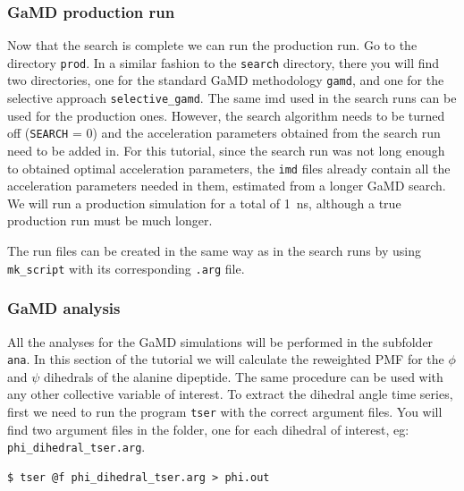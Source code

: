 \subsubsection{GaMD production run}
Now that the search is complete we can run the production run.
Go to the directory \texttt{prod}. In a similar fashion to the \texttt{search} directory, there you will find two directories, one for the standard GaMD methodology \texttt{gamd}, and one for the selective approach \texttt{selective\_gamd}. 
The same imd used in the search runs can be used for the production ones. However, the search algorithm needs to be turned off (\texttt{SEARCH} = 0) and the acceleration parameters obtained from the search run need to be added in. 
For this tutorial, since the search run was not long enough to obtained optimal acceleration parameters, the \texttt{imd} files already contain all the acceleration parameters needed in them, estimated from a longer GaMD search. We will run a production simulation for a total of 1~ns, although a true production run must be much longer.

The run files can be created in the same way as in the search runs by using \texttt{mk\_script} with its corresponding \texttt{.arg} file.

\subsubsection{GaMD analysis}

All the analyses for the GaMD simulations will be performed in the subfolder \texttt{ana}. 
In this section of the tutorial we will calculate the reweighted PMF for the $\phi$ and $\psi$ dihedrals of the alanine dipeptide. The same procedure can be used with any other collective variable of interest.
To extract the dihedral angle time series, first we need to run the program \texttt{tser} with the correct argument files. You will find two argument files in the folder, one for each dihedral of interest, eg: \texttt{phi\_dihedral\_tser.arg}.
 \begin{lstlisting}
$ tser @f phi_dihedral_tser.arg > phi.out
\end{lstlisting}

